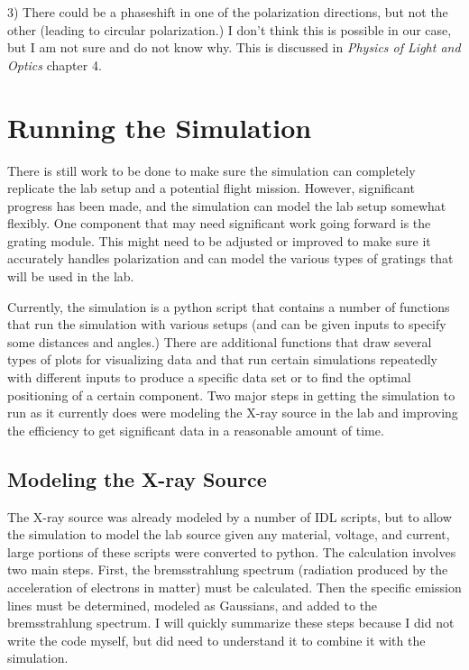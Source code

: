 \documentclass[manuscript]{aastex}
\begin{document}
3) There could be a phaseshift in one of the polarization directions, but not the other (leading to circular polarization.) I don't think this is possible in our case, but I am not sure and do not know why. This is discussed in \textit{Physics of Light and Optics} chapter 4.

\section{Running the Simulation}

There is still work to be done to make sure the simulation can completely replicate the lab setup and a potential flight mission. However, significant progress has been made, and the simulation can model the lab setup somewhat flexibly. One component that may need significant work going forward is the grating module. This might need to be adjusted or improved to make sure it accurately handles polarization and can model the various types of gratings that will be used in the lab.

Currently, the simulation is a python script that contains a number of functions that run the simulation with various setups (and can be given inputs to specify some distances and angles.) There are additional functions that draw several types of plots for visualizing data and that run certain simulations repeatedly with different inputs to produce a specific data set or to find the optimal positioning of a certain component. Two major steps in getting the simulation to run as it currently does were modeling the X-ray source in the lab and improving the efficiency to get significant data in a reasonable amount of time.

\subsection{Modeling the X-ray Source}

The X-ray source was already modeled by a number of IDL scripts, but to allow the simulation to model the lab source given any material, voltage, and current, large portions of these scripts were converted to python. The calculation involves two main steps. First, the bremsstrahlung spectrum (radiation produced by the acceleration of electrons in matter) must be calculated. Then the specific emission lines must be determined, modeled as Gaussians, and added to the bremsstrahlung spectrum. I will quickly summarize these steps because I did not write the code myself, but did need to understand it to combine it with the simulation.
\end{document}
